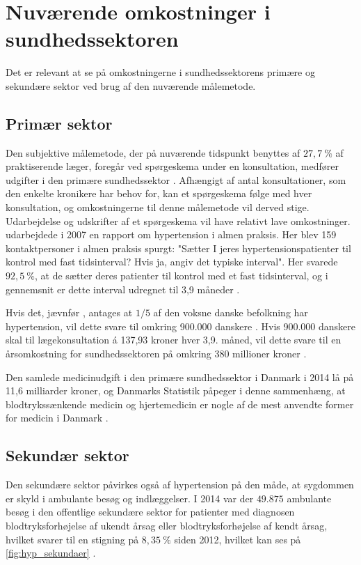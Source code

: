 \section{Nuværende omkostninger i sundhedssektoren}
Det er relevant at se på omkostningerne i sundhedssektorens primære og sekundære sektor ved brug af den nuværende målemetode. 

\subsection{Primær sektor}
Den subjektive målemetode, der på nuværende tidspunkt benyttes af $27,7~\%$ af praktiserende læger, foregår ved spørgeskema under en konsultation, medfører udgifter i den primære sundhedssektor \citep{munck2007}. Afhængigt af antal konsultationer, som den enkelte kronikere har behov for, kan et spørgeskema følge med hver konsultation, og omkostningerne til denne målemetode vil derved stige. Udarbejdelse og udskrifter af et spørgeskema vil have relativt lave omkostninger.
\citeauthor{munck2007} udarbejdede i 2007 en rapport om hypertension i almen praksis. Her blev 159 kontaktpersoner i almen praksis spurgt: "Sætter I jeres hypertensionspatienter til kontrol med fast tidsinterval? Hvis ja, angiv det typiske interval". Her svarede $92,5~\%$, at de sætter deres patienter til kontrol med et fast tidsinterval, og i gennemsnit er dette interval udregnet til 3,9 måneder \citep{munck2007}. 

Hvis det, jævnfør \citeauthor{kronborg2008}, antages at $1/5$ af den voksne danske befolkning har hypertension, vil dette svare til omkring 900.000 danskere \citep{folketal2016}. Hvis 900.000 danskere skal til lægekonsultation á 137,93 kroner hver 3,9. måned, vil dette svare til en årsomkostning for sundhedssektoren på omkring 380 millioner kroner \citep{honorartabel2016}. 

Den samlede medicinudgift i den primære sundhedssektor i Danmark i 2014 lå på 11,6 milliarder kroner, og Danmarks Statistik påpeger i denne sammenhæng, at blodtrykssænkende medicin og hjertemedicin er nogle af de mest anvendte former for medicin i Danmark \citep{dst2016}. 

\subsection{Sekundær sektor}
Den sekundære sektor påvirkes også af hypertension på den måde, at sygdommen er skyld i ambulante besøg og indlæggelser. I 2014 var der $49.875$ ambulante besøg i den offentlige sekundære sektor for patienter med diagnosen blodtryksforhøjelse af ukendt årsag eller blodtryksforhøjelse af kendt årsag, hvilket svarer til en stigning på $8,35~\%$ siden 2012, hvilket kan ses på \autoref{fig:hyp_sekundaer} \citep{sundhedsdatastyrelsen2016}. 

